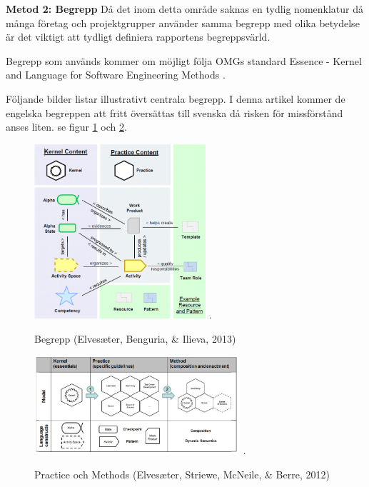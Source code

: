 \documentclass[conference,a4paper]{IEEEtran}
\begin{document}
\textbf{Metod 2: Begrepp} Då det inom detta område saknas en tydlig nomenklatur då många företag och projektgrupper använder samma begrepp med olika betydelse är det viktigt att tydligt definiera rapportens begreppsvärld.

Begrepp som används kommer om möjligt följa OMGs \cite{OMG} standard Essence - Kernel and Language for Software Engineering Methods \cite{Jacobson13}.

Följande bilder listar illustrativt centrala begrepp. I denna artikel kommer de engelska begreppen att fritt översättas till svenska då risken för missförstånd anses liten. se figur \ref{begrepp} och \ref{practice}.

\begin{figure}[H]
\centering
\includegraphics[width=2.5in]{essencebegrepp}
\DeclareGraphicsExtensions.
\caption{Begrepp (Elves{\ae}ter, Benguria, \& Ilieva, 2013)}
\label{begrepp}
\end{figure}

\begin{figure}[H]
\centering
\includegraphics[width=3in]{practice}
\DeclareGraphicsExtensions.
\caption{Practice och Methods (Elves{\ae}ter, Striewe, McNeile, \& Berre, 2012)}
\label{practice}
\end{figure}
\end{document}
